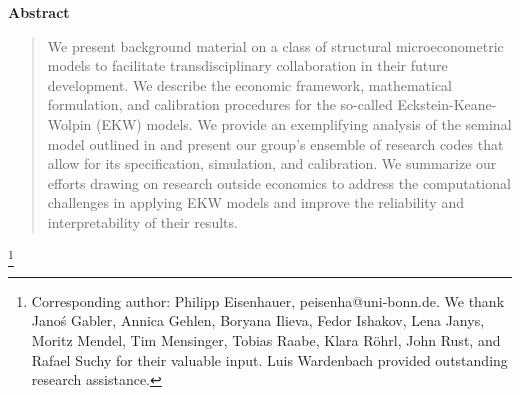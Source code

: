 
\maketitle


\vspace{0.5cm}
\renewcommand{\baselinestretch}{1.3}\normalsize

\setcounter{page}{1}
\thispagestyle{empty}

\begin{center}\textbf{Abstract}\end{center}
\begin{abstract}
\noindent We present background material on a class of structural microeconometric models to facilitate transdisciplinary collaboration in their future development. We describe the economic framework, mathematical formulation, and calibration procedures for the so-called Eckstein-Keane-Wolpin (EKW) models. We provide an exemplifying analysis of the seminal model outlined in \citet{Keane.1997} and present our group's ensemble of research codes that allow for its specification, simulation, and calibration. We summarize our efforts drawing on research outside economics to
address the computational challenges in applying EKW models and improve the reliability and interpretability of their results.
\end{abstract}

{\let\thefootnote\relax\footnote{Corresponding author: Philipp Eisenhauer, peisenha@uni-bonn.de. We thank  Jano\'s Gabler, Annica Gehlen, Boryana Ilieva, Fedor Ishakov, Lena Janys, Moritz Mendel, Tim Mensinger, Tobias Raabe, Klara R\"ohrl, John Rust, and Rafael Suchy for their valuable input. Luis Wardenbach provided outstanding research assistance.}}

\setcounter{page}{1}
 \setcounter{footnote}{0}
\thispagestyle{empty}

\newpage
\tableofcontents
\newpage
